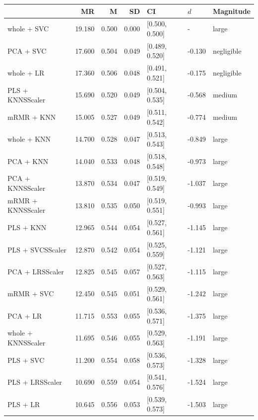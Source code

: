 \documentclass[a4paper,oneside,11pt,leqno]{article}
\begin{document}
	\begin{table}[h]
		\centering
		\begin{tabular}{lrrrlll}
			\toprule
			{} &     MR &     M &    SD &              CI &    $d$ &   Magnitude \\
			\midrule
			whole + SVC        & 19.180 & 0.500 & 0.000 &  [0.500, 0.500] &      - &       large \\
			PCA + SVC          & 17.600 & 0.504 & 0.049 &  [0.489, 0.520] & -0.130 &  negligible \\
			whole + LR         & 17.360 & 0.506 & 0.048 &  [0.491, 0.521] & -0.175 &  negligible \\
			PLS + KNNSScaler   & 15.690 & 0.520 & 0.049 &  [0.504, 0.535] & -0.568 &      medium \\
			mRMR + KNN         & 15.005 & 0.527 & 0.049 &  [0.511, 0.542] & -0.774 &      medium \\
			whole + KNN        & 14.700 & 0.528 & 0.047 &  [0.513, 0.543] & -0.849 &       large \\
			PCA + KNN          & 14.040 & 0.533 & 0.048 &  [0.518, 0.548] & -0.973 &       large \\
			PCA + KNNSScaler   & 13.870 & 0.534 & 0.047 &  [0.519, 0.549] & -1.037 &       large \\
			mRMR + KNNSScaler  & 13.810 & 0.535 & 0.050 &  [0.519, 0.551] & -0.993 &       large \\
			PLS + KNN          & 12.965 & 0.544 & 0.054 &  [0.527, 0.561] & -1.145 &       large \\
			PLS + SVCSScaler   & 12.870 & 0.542 & 0.054 &  [0.525, 0.559] & -1.121 &       large \\
			PCA + LRSScaler    & 12.825 & 0.545 & 0.057 &  [0.527, 0.563] & -1.115 &       large \\
			mRMR + SVC         & 12.450 & 0.545 & 0.051 &  [0.529, 0.561] & -1.242 &       large \\
			PCA + LR           & 11.715 & 0.553 & 0.055 &  [0.536, 0.571] & -1.375 &       large \\
			whole + KNNSScaler & 11.695 & 0.546 & 0.055 &  [0.529, 0.563] & -1.191 &       large \\
			PLS + SVC          & 11.200 & 0.554 & 0.058 &  [0.536, 0.573] & -1.328 &       large \\
			PLS + LRSScaler    & 10.690 & 0.559 & 0.054 &  [0.541, 0.576] & -1.524 &       large \\
			PLS + LR           & 10.645 & 0.556 & 0.053 &  [0.539, 0.573] & -1.503 &       large \\

\end{tabular}
\end{table}
\end{document}
